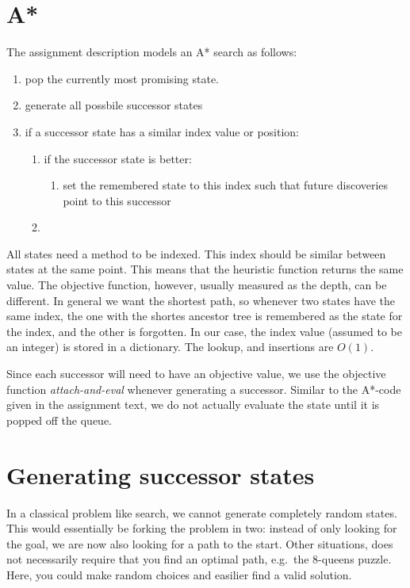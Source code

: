 \documentclass[journal]{IEEEtran}
\begin{document}
\section{A*}
The assignment description models an A* search as follows:
\begin{enumerate}
    \item pop the currently most promising state.
    \item generate all possbile successor states
    \item if a successor state has a similar index value or position:
        \begin{enumerate}
            \item if the successor state is better:
                \begin{enumerate}
                    \item set the remembered state to this index such that future
                        discoveries point to this successor
                \end{enumerate}
            \item 
        \end{enumerate}
\end{enumerate}

All states need a method to be indexed. This index should be similar between
states at the same point. This means that the heuristic function returns the same
value. The objective function, however, usually measured as the depth, can be
different. In general we want the shortest path, so whenever two states
have the same index, the one with the shortes ancestor tree is remembered
as the state for the index, and the other is forgotten.
In our case, the index value (assumed to be an integer) is stored in a dictionary.
The lookup, and insertions are $O(1)$.

Since each successor will need to have an objective value, we use the objective
function \textit{attach-and-eval} whenever generating a successor. Similar to 
the A*-code given in the assignment text, we do not actually evaluate the 
state until it is popped off the queue.

\section{Generating successor states}
In a classical problem like search, we cannot generate completely random
states. This would essentially be forking the problem in two: instead of only
looking for the goal, we are now also looking for a path to the start.
Other situations, does not necessarily require that you find an optimal path,
e.g.\ the 8-queens puzzle. Here, you could make random choices and easilier
find a valid solution.
\end{document}

